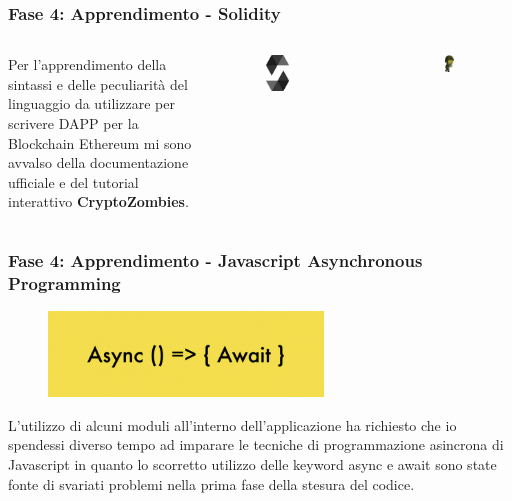 \documentclass{beamer}
\begin{document}
\begin{frame}
	\frametitle{Fase 4: Apprendimento - Solidity}
	\begin{columns}
		Per l’apprendimento della sintassi e delle peculiarità del linguaggio da utilizzare per scrivere DAPP per la Blockchain Ethereum mi sono avvalso della documentazione ufficiale e del tutorial interattivo \textbf{CryptoZombies}.	
		\begin{figure}
			\includegraphics[width=0.30\textwidth]{figures/solidity.png}
		\end{figure}
		\begin{figure}
			\includegraphics[width=0.40\textwidth]{figures/zombie.png}
		\end{figure}
	\end{columns}
\end{frame}
\begin{frame}
	\frametitle{Fase 4: Apprendimento - Javascript Asynchronous Programming}	
	\begin{figure}
		\includegraphics[width=0.65\textwidth]{figures/async.jpg}
	\end{figure}
	L’utilizzo di alcuni moduli all’interno dell’applicazione ha richiesto che io spendessi diverso tempo ad imparare le tecniche di programmazione asincrona di Javascript in quanto lo scorretto utilizzo delle keyword async e await sono state fonte di svariati problemi nella prima fase della stesura del codice.
\end{frame}
\end{document}
